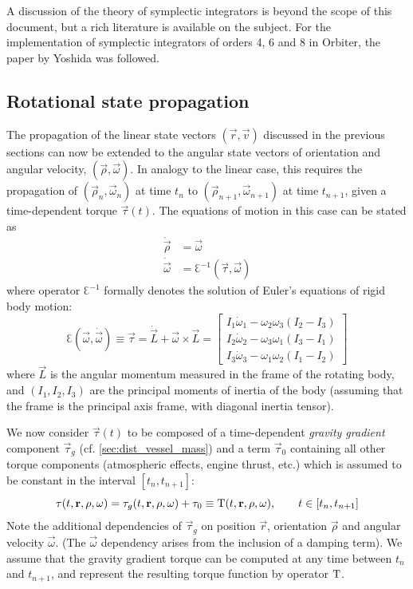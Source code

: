 \documentclass[Orbiter Technical Reference.tex]{subfiles}
\begin{document}
A discussion of the theory of symplectic integrators is beyond the scope of this document, but a rich literature is available on the subject. For the implementation of symplectic integrators of orders 4, 6 and 8 in Orbiter, the paper by Yoshida \cite{yoshida1990} was followed.

\subsection{Rotational state propagation}
The propagation of the linear state vectors $(\vec{r},\vec{v})$ discussed in the previous sections can now be extended to the angular state vectors of orientation and angular velocity, $(\vec{\rho},\vec{\omega})$. In analogy to the linear case, this requires the propagation of $(\vec{\rho}_n,\vec{\omega}_n)$ at time $t_n$ to $(\vec{\rho}_{n+1},\vec{\omega}_{n+1})$ at time $t_{n+1}$, given a time-dependent torque $\vec{\tau}(t)$.
The equations of motion in this case can be stated as
\begin{equation}
\begin{split}
\dot{\vec{\rho}} &= \vec\omega \\
\dot{\vec{\omega}} &= \Euler^{-1}(\vec\tau,\vec\omega)
\end{split}
\end{equation}
where operator $\Euler^{-1}$ formally denotes the solution of Euler's equations of rigid body motion:
\begin{equation}
\Euler(\vec\omega,\dot{\vec\omega}) \equiv \vec\tau = 
\dot{\vec{L}}+\vec\omega \times \vec{L} =
\left[
\begin{array}{ccc}
I_1\dot\omega_1 - \omega_2\omega_3(I_2-I_3) \\
I_2\dot\omega_2 - \omega_3\omega_1(I_3-I_1) \\
I_3\dot\omega_3 - \omega_1\omega_2(I_1-I_2)
\end{array}
\right]
\end{equation}
where $\vec{L}$ is the angular momentum measured in the frame of the rotating body, and $(I_1,I_2,I_3)$ are the principal moments of inertia of the body (assuming that the frame is the principal axis frame, with diagonal inertia tensor).

We now consider $\vec\tau(t)$ to be composed of a time-dependent \emph{gravity gradient} component $\vec\tau_g$ (cf. \ref{sec:dist_vessel_mass}) and a term $\vec\tau_0$ containing all other torque components (atmospheric effects, engine thrust, etc.) which is assumed to be constant in the interval $[t_n, t_{n+1}]$:
\begin{equation}
\mathbf{\tau}(t,\mathbf{r},\mathbf{\rho},\mathbf{\omega}) = \mathbf{\tau}_g(t,\mathbf{r},\mathbf{\rho},\mathbf{\omega}) + \mathbf{\tau}_0 \equiv \mathrm{T}(t,\mathbf{r},\mathbf{\rho},\mathbf{\omega}), \qquad t \in [t_n, t_{n+1}]
\end{equation}
Note the additional dependencies of $\vec\tau_g$ on position $\vec{r}$, orientation $\vec\rho$ and angular velocity $\vec\omega$. (The $\vec\omega$ dependency arises from the inclusion of a damping term).
We assume that the gravity gradient torque can be computed at any time between $t_n$ and $t_{n+1}$, and represent the resulting torque function by operator $\mathrm{T}$.
\end{document}
